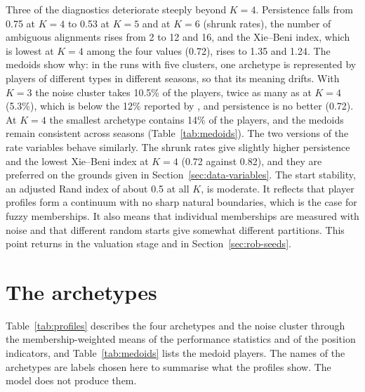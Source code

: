 Three of the diagnostics deteriorate steeply beyond $K=4$. Persistence falls from 0.75 at $K=4$ to 0.53 at $K=5$ and at $K=6$ (shrunk rates), the number of ambiguous alignments rises from 2 to 12 and 16, and the Xie--Beni index, which is lowest at $K=4$ among the four values (0.72), rises to 1.35 and 1.24. The medoids show why: in the runs with five clusters, one archetype is represented by players of different types in different seasons, so that its meaning drifts. With $K=3$ the noise cluster takes 10.5\% of the players, twice as many as at $K=4$ (5.3\%), which is below the 12\% reported by , and persistence is no better (0.72). At $K=4$ the smallest archetype contains 14\% of the players, and the medoids remain consistent across seasons (Table~\ref{tab:medoids}). The two versions of the rate variables behave similarly. The shrunk rates give slightly higher persistence and the lowest Xie--Beni index at $K=4$ (0.72 against 0.82), and they are preferred on the grounds given in Section~\ref{sec:data-variables}. The start stability, an adjusted Rand index of about 0.5 at all $K$, is moderate. It reflects that player profiles form a continuum with no sharp natural boundaries, which is the case for fuzzy memberships. It also means that individual memberships are measured with noise and that different random starts give somewhat different partitions. This point returns in the valuation stage and in Section~\ref{sec:rob-seeds}.

\section{The archetypes}
\label{sec:results-archetypes}

Table~\ref{tab:profiles} describes the four archetypes and the noise cluster through the membership-weighted means of the performance statistics and of the position indicators, and Table~\ref{tab:medoids} lists the medoid players. The names of the archetypes are labels chosen here to summarise what the profiles show. The model does not produce them.

